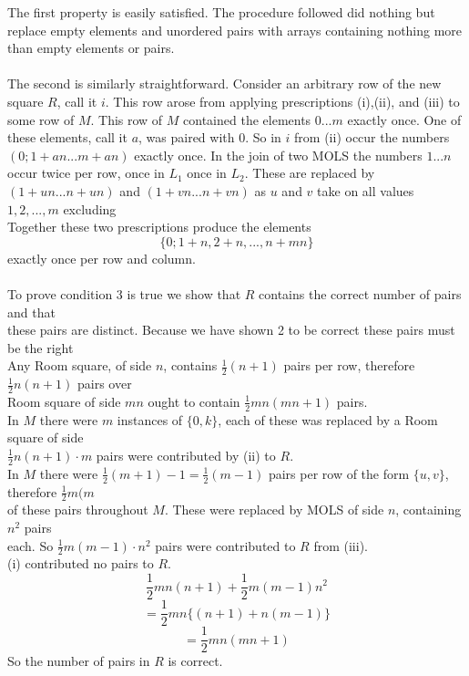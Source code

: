 \documentclass[
  12pt,
  a4paper]{book}
\begin{document}
The first property is easily satisfied. The procedure followed did
nothing but replace empty elements and unordered pairs with arrays
containing nothing more than empty elements or pairs.\\
~\\
The second is similarly straightforward. Consider an arbitrary row of
the new square \(R\), call it \(i\). This row arose from applying
prescriptions (i),(ii), and (iii) to some row of \(M\). This row of \(M\)
contained the elements \(0...m\) exactly once. One of these elements, call
it \(a\), was paired with 0. So in \(i\) from (ii) occur the numbers
\((0;1+an...m+an)\) exactly once. In the join of two MOLS the numbers
\(1...n\) occur twice per row, once in \(L_1\) once in \(L_2\). These are
replaced by \((1+un...n+un)\) and \((1+vn...n+vn)\) as \(u\) and \(v\) take on
all values \(1,2,...,m\) excluding\\
Together these two prescriptions produce the elements
\[\{0;1+n,2+n,...,n+mn\}\] exactly once per row and column.\\
~\\
To prove condition 3 is true we show that \(R\) contains the correct
number of pairs and that\\
these pairs are distinct. Because we have shown 2 to be correct these
pairs must be the right\\
Any Room square, of side \(n\), contains \(\frac{1}{2}(n+1)\) pairs per row,
therefore \(\frac{1}{2}n(n+1)\) pairs over\\
Room square of side \(mn\) ought to contain \(\frac{1}{2}mn(mn+1)\) pairs.\\
In \(M\) there were \(m\) instances of \(\{0,k\}\), each of these was replaced
by a Room square of side\\
\(\frac{1}{2}n(n+1) \cdot m\) pairs were contributed by (ii) to \(R\).\\
In \(M\) there were \(\frac{1}{2}(m+1)-1 = \frac{1}{2} (m-1)\) pairs per row
of the form \(\{u,v\}\), therefore \(\frac{1}{2}m(m\)\\
of these pairs throughout \(M\). These were replaced by MOLS of side \(n\),
containing \(n^2\) pairs\\
each. So \(\frac{1}{2}m(m-1) \cdot n^2\) pairs were contributed to \(R\)
from (iii).\\
(i) contributed no pairs to \(R\).
\[\frac{1}{2} mn (n+1) + \frac{1}{2}m(m-1)n^2\]
\[=\frac{1}{2}mn\{(n+1)+n(m-1)\}\] \[=\frac{1}{2}mn(mn+1)\] So the
number of pairs in \(R\) is correct.\\
\end{document}

